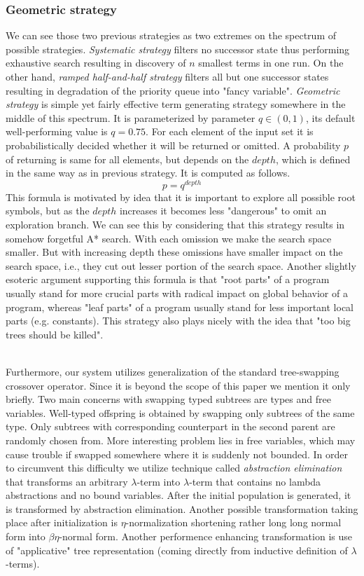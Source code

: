 \documentclass[conference]{IEEEtran}
\newcommand{\lterm}{$\lambda$-term\xspace}
\newcommand{\lterms}{$\lambda$-terms\xspace}
\begin{document}
\subsubsection{Geometric strategy}

We can see those two previous strategies as two extremes on the spectrum of 
possible strategies. 
\textit{Systematic strategy} filters no successor state thus performing
exhaustive search resulting in discovery of $n$ smallest terms in one run.
On the other hand, \textit{ramped half-and-half strategy} filters 
all but one successor states resulting in degradation of 
the priority queue into "fancy variable".
\textit{Geometric strategy} is simple yet fairly effective term generating 
strategy somewhere in the middle of this spectrum.
It is parameterized by parameter $q \in (0,1)$, its default well-performing 
value is $q = 0.75$.
For each element of the input set 
it is probabilistically decided whether
it will be returned or omitted. A probability $p$ of returning is
same for all elements, but depends on the $depth$, 
which is defined in the same way as in previous strategy. 
It is computed as follows.
$$ p = q^{depth} $$
This formula is motivated by idea that it is important to
explore all possible root symbols, but as the $depth$ 
increases it becomes less "dangerous" to omit 
an exploration branch. 
We can see this by considering that this strategy results in
somehow forgetful A* search.
With each omission we make the search space smaller. But with
increasing depth these omissions have smaller impact on the search space,
i.e., they cut out lesser portion of the search space.
Another slightly esoteric argument supporting this formula is that "root 
parts" of a program usually stand for more crucial parts
with radical impact on global behavior of a program, 
whereas "leaf parts" of a program usually
stand for less important local parts (e.g. constants).  
This strategy also plays nicely with the idea that 
"too big trees should be killed".

~\\
Furthermore, our system utilizes generalization of the standard 
tree-swapping crossover operator. Since it is beyond the scope of this 
paper we mention it only briefly. Two main concerns with swapping typed subtrees 
are types and free variables. Well-typed offspring is obtained 
by swapping only subtrees of the same type. Only subtrees with 
corresponding counterpart in the second parent are randomly chosen from.
More interesting problem lies in free variables, which may cause trouble
if swapped somewhere where it is suddenly not bounded. In order to circumvent this
difficulty we utilize technique called \textit{abstraction elimination}\cite{jones87}
that transforms an arbitrary \lterm into \lterm that contains no lambda abstractions
and no bound variables. After the initial population is generated,  it is transformed
by abstraction elimination. Another possible transformation taking place
after initialization is $\eta$-normalization shortening 
rather long long normal form into $\beta\eta$-normal form.  
Another performence enhancing transformation is use of "applicative" tree 
representation (coming directly from inductive definition of \lterms). 
\end{document}
